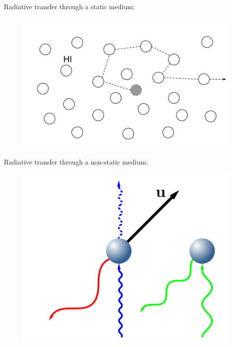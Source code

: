 \documentclass{beamer}
\begin{document}
\begin{frame}{Radiative transfer through a static medium:}
\begin{figure}
\includegraphics[scale=0.3]{Figures/RT.png}
\end{figure}
\end{frame}

\begin{frame}{Radiative transfer through a non-static medium:}
\begin{figure}
\includegraphics[scale=0.4]{Figures/xshift.png}
\end{figure}
\end{frame}
\end{document}
